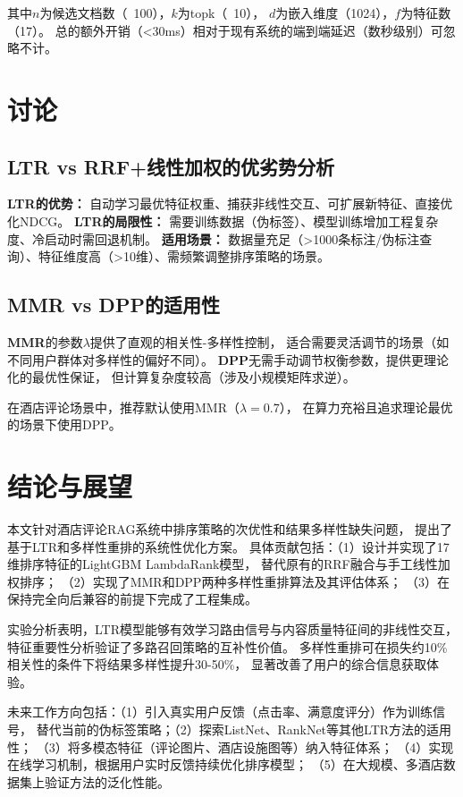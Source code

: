 \documentclass[10pt,a4paper]{article}
\begin{document}
其中$n$为候选文档数（~100），$k$为topk（~10），
$d$为嵌入维度（1024），$f$为特征数（17）。
总的额外开销（<30ms）相对于现有系统的端到端延迟（数秒级别）可忽略不计。

\section{讨论}

\subsection{LTR vs RRF+线性加权的优劣势分析}

\textbf{LTR的优势：}
自动学习最优特征权重、捕获非线性交互、可扩展新特征、直接优化NDCG。
\textbf{LTR的局限性：}
需要训练数据（伪标签）、模型训练增加工程复杂度、冷启动时需回退机制。
\textbf{适用场景：}
数据量充足（>1000条标注/伪标注查询）、特征维度高（>10维）、需频繁调整排序策略的场景。

\subsection{MMR vs DPP的适用性}

\textbf{MMR}的参数$\lambda$提供了直观的相关性-多样性控制，
适合需要灵活调节的场景（如不同用户群体对多样性的偏好不同）。
\textbf{DPP}无需手动调节权衡参数，提供更理论化的最优性保证，
但计算复杂度较高（涉及小规模矩阵求逆）。

在酒店评论场景中，推荐默认使用MMR（$\lambda=0.7$），
在算力充裕且追求理论最优的场景下使用DPP。

\section{结论与展望}

本文针对酒店评论RAG系统中排序策略的次优性和结果多样性缺失问题，
提出了基于LTR和多样性重排的系统性优化方案。
具体贡献包括：（1）设计并实现了17维排序特征的LightGBM LambdaRank模型，
替代原有的RRF融合与手工线性加权排序；
（2）实现了MMR和DPP两种多样性重排算法及其评估体系；
（3）在保持完全向后兼容的前提下完成了工程集成。

实验分析表明，LTR模型能够有效学习路由信号与内容质量特征间的非线性交互，
特征重要性分析验证了多路召回策略的互补性价值。
多样性重排可在损失约10\%相关性的条件下将结果多样性提升30-50\%，
显著改善了用户的综合信息获取体验。

未来工作方向包括：（1）引入真实用户反馈（点击率、满意度评分）作为训练信号，
替代当前的伪标签策略；（2）探索ListNet、RankNet等其他LTR方法的适用性；
（3）将多模态特征（评论图片、酒店设施图等）纳入特征体系；
（4）实现在线学习机制，根据用户实时反馈持续优化排序模型；
（5）在大规模、多酒店数据集上验证方法的泛化性能。
\end{document}
